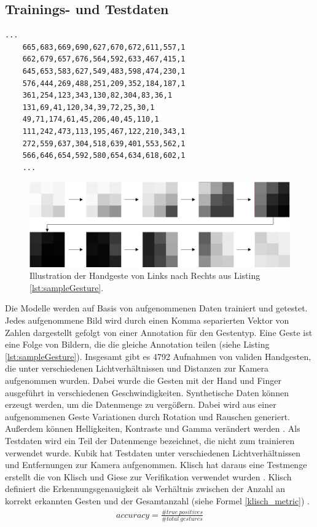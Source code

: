 \subsection{Trainings- und Testdaten}
\label{sec:synthetischeDaten}
\label{sec:testdaten}
\begin{lstlisting}[label=lst:sampleGesture,caption={Beispiel einer gespeicherten Handgeste von Links nach Rechts.}]
    ...
    665,683,669,690,627,670,672,611,557,1
    662,679,657,676,564,592,633,467,415,1
    645,653,583,627,549,483,598,474,230,1
    576,444,269,488,251,209,352,184,187,1
    361,254,123,343,130,82,304,83,36,1
    131,69,41,120,34,39,72,25,30,1
    49,71,174,61,45,206,40,45,110,1
    111,242,473,113,195,467,122,210,343,1
    272,559,637,304,518,639,401,553,562,1
    566,646,654,592,580,654,634,618,602,1
    ...
\end{lstlisting}
\begin{figure}
    \centering
    \includegraphics[width=\linewidth]{images/sample_gesture_total.jpg}
    \caption{Illustration der Handgeste von Links nach Rechts aus Listing \ref{lst:sampleGesture}.}
    \label{fig:sample_gesture}
\end{figure}
Die Modelle werden auf Basis von aufgenommenen Daten trainiert und getestet. Jedes aufgenommene Bild wird durch einen Komma separierten Vektor von Zahlen dargestellt gefolgt von einer Annotation für den Gestentyp.
Eine Geste ist eine Folge von Bildern, die die gleiche Annotation teilen (siehe Listing \ref{lst:sampleGesture}). Insgesamt gibt es 4792 Aufnahmen von validen Handgesten, die unter verschiedenen Lichtverhältnissen
und Distanzen zur Kamera aufgenommen wurden. Dabei wurde die Gesten mit der Hand und Finger ausgeführt in verschiedenen Geschwindigkeiten.
\newline
\newline
Synthetische Daten können erzeugt werden, um die Datenmenge zu vergößern. Dabei wird aus einer aufgenommenen Geste Variationen durch Rotation und Rauschen generiert. Außerdem können Helligkeiten,
Kontraste und Gamma verändert werden \cite{venzkeArticle}.
\newline
\newline
Als Testdaten wird ein Teil der Datenmenge bezeichnet, die nicht zum trainieren verwendet wurde. Kubik hat Testdaten unter verschiedenen Lichtverhältnissen und Entfernungen zur Kamera aufgenommen. Klisch hat
daraus eine Testmenge erstellt die von Klisch und Giese zur Verifikation verwendet wurden \cite{klischThesis, gieseThesis}. Klisch definiert die Erkennungsgenauigkeit als Verhältnis zwischen der Anzahl an korrekt
erkannten Gesten und der Gesamtanzahl (siehe Formel \ref{klisch_metric}) \cite{klischThesis}.
\begin{align}
    accuracy = \frac{\#true\ positives}{\#total\ gestures}
    \label{klisch_metric}
\end{align}

